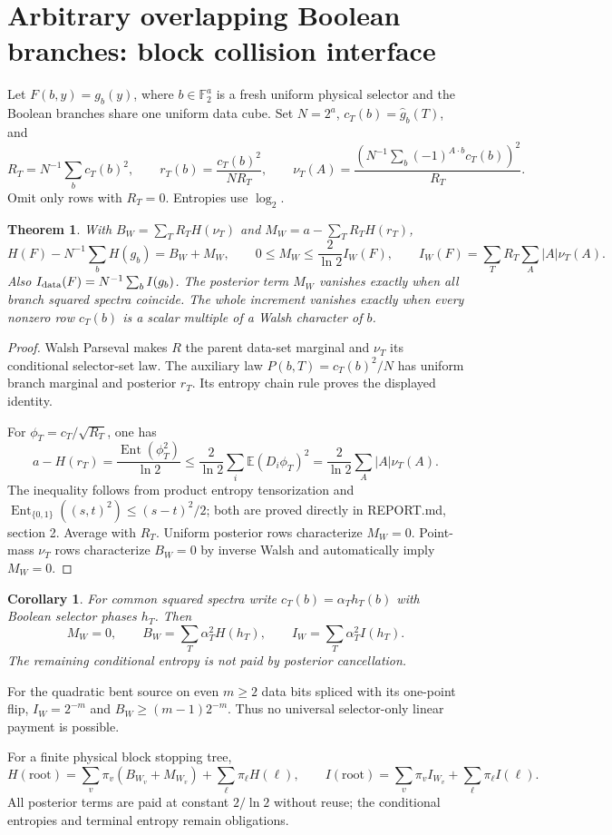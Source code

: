 \documentclass[11pt]{article}
\newtheorem{theorem}{Theorem}
\newtheorem{corollary}{Corollary}
\begin{document}
\section*{Arbitrary overlapping Boolean branches: block collision interface}
Let $F(b,y)=g_b(y)$, where $b\in\mathbb F_2^a$ is a fresh uniform
physical selector and the Boolean branches share one uniform data cube.
Set $N=2^a$, $c_T(b)=\widehat g_b(T)$, and
\[
 R_T=N^{-1}\sum_b c_T(b)^2,\qquad
 r_T(b)=\frac{c_T(b)^2}{NR_T},\qquad
 \nu_T(A)=\frac{(N^{-1}\sum_b(-1)^{A\cdot b}c_T(b))^2}{R_T}.
\]
Omit only rows with $R_T=0$. Entropies use $\log_2$.
\begin{theorem}
With $B_W=\sum_T R_TH(\nu_T)$ and
$M_W=a-\sum_T R_TH(r_T)$,
\[
 H(F)-N^{-1}\sum_b H(g_b)=B_W+M_W,\qquad
 0\le M_W\le\frac{2}{\ln2}I_W(F),\qquad
 I_W(F)=\sum_T R_T\sum_A |A|\nu_T(A).
\]
Also $I_{\rm data}(F)=N^{-1}\sum_b I(g_b)$.
The posterior term $M_W$ vanishes exactly when all branch squared spectra
coincide. The whole increment vanishes exactly when every nonzero row
$c_T(b)$ is a scalar multiple of a Walsh character of $b$.
\end{theorem}
\begin{proof}
Walsh Parseval makes $R$ the parent data-set marginal and $\nu_T$ its
conditional selector-set law. The auxiliary law
$P(b,T)=c_T(b)^2/N$ has uniform branch marginal and posterior $r_T$.
Its entropy chain rule proves the displayed identity.

For $\phi_T=c_T/\sqrt{R_T}$, one has
\[
 a-H(r_T)=\frac{\operatorname{Ent}(\phi_T^2)}{\ln2}
 \le\frac{2}{\ln2}\sum_i\mathbb E(D_i\phi_T)^2
 =\frac{2}{\ln2}\sum_A|A|\nu_T(A).
\]
The inequality follows from product entropy tensorization and
$\operatorname{Ent}_{\{0,1\}}((s,t)^2)\le(s-t)^2/2$;
both are proved directly in REPORT.md, section 2. Average with $R_T$.
Uniform posterior rows characterize $M_W=0$. Point-mass $\nu_T$ rows
characterize $B_W=0$ by inverse Walsh and automatically imply $M_W=0$.
\end{proof}
\begin{corollary}
For common squared spectra write $c_T(b)=\alpha_T h_T(b)$ with Boolean
selector phases $h_T$. Then
\[
 M_W=0,\qquad B_W=\sum_T\alpha_T^2 H(h_T),\qquad
 I_W=\sum_T\alpha_T^2 I(h_T).
\]
The remaining conditional entropy is not paid by posterior cancellation.
\end{corollary}
For the quadratic bent source on even $m\ge2$ data bits spliced with
its one-point flip, $I_W=2^{-m}$ and $B_W\ge(m-1)2^{-m}$.
Thus no universal selector-only linear payment is possible.

For a finite physical block stopping tree,
\[
 H(\text{root})=\sum_v\pi_v(B_{W_v}+M_{W_v})+
 \sum_\ell\pi_\ell H(\ell),\qquad
 I(\text{root})=\sum_v\pi_v I_{W_v}+\sum_\ell\pi_\ell I(\ell).
\]
All posterior terms are paid at constant $2/\ln2$ without reuse;
the conditional entropies and terminal entropy remain obligations.
\end{document}
